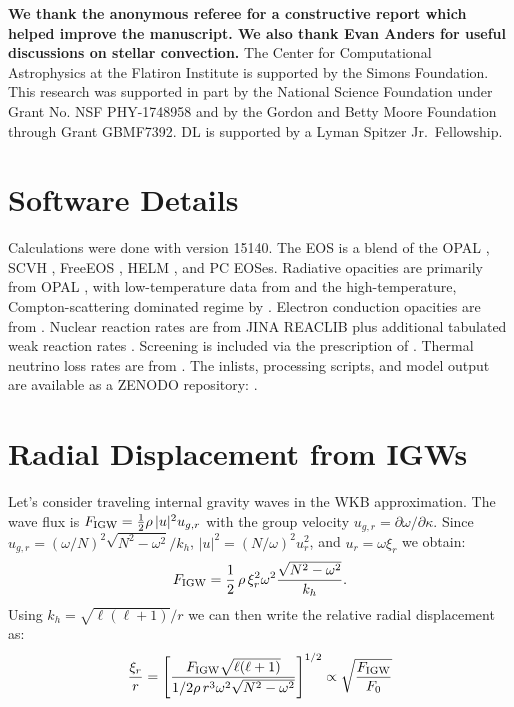 \documentclass[twocolumn]{aastex63}
\begin{document}
\acknowledgments
{\bf We thank the anonymous referee for a constructive report which helped improve the manuscript. We also thank Evan Anders for useful discussions on stellar convection.}
The Center for Computational Astrophysics at the Flatiron Institute is supported by the Simons Foundation.
This research was supported in part by the National Science Foundation under Grant No. NSF PHY-1748958 and by the Gordon and Betty Moore Foundation through Grant GBMF7392. DL is supported by a Lyman Spitzer Jr.~Fellowship.

\appendix
\section{Software Details}
\label{sec:software}

Calculations were done with  version 15140.
The  EOS is a blend of the OPAL \citep{Rogers2002}, SCVH
\citep{Saumon1995}, FreeEOS \citep{Irwin2004}, HELM \citep{Timmes2000},
and PC \citep{Potekhin2010} EOSes.
Radiative opacities are primarily from OPAL \citep{Iglesias1993,
Iglesias1996}, with low-temperature data from \citet{Ferguson2005}
and the high-temperature, Compton-scattering dominated regime by
\citet{Buchler1976}.  Electron conduction opacities are from
\citet{Cassisi2007}.
Nuclear reaction rates are from JINA REACLIB \citep{Cyburt2010} plus
additional tabulated weak reaction rates \citet{Fuller1985, Oda1994,
Langanke2000}.  Screening is included via the prescription of \citet{Chugunov2007}.
Thermal neutrino loss rates are from \citet{Itoh1996}.
The inlists, processing scripts, and model output are available as a ZENODO repository: .


\section{Radial Displacement from IGWs}
\label{appen:xir}
Let's consider traveling internal gravity waves in the WKB approximation. 
The wave flux  is  $F_{\rm IGW} = \frac{1}{2} \rho \, |u|^2 u_{g,r}$
 with the group velocity $u_{g,r} = \partial \omega/\partial \kappa $.
Since  $u_{g,r} = (\omega/N)^2 \sqrt{N^2 - \omega^2} / k_h$,  $|u|^2 = (N/\omega)^2 u_r^2$, and 
$u_r = \omega \xi_r$ we obtain: 
\begin{equation}
F_{\rm IGW} = \frac{1}{2} \,\rho\, \xi_r^2 \omega^2 \frac{\sqrt{N^2-\omega^2}}{k_h}.
\end{equation}
Using  $k_h = \sqrt{\ell(\ell+1)}/r$ we can then write the relative radial displacement as:
\begin{equation}
\frac{\xi_r}{r} = \left[ \frac{F_{\rm IGW} \sqrt{\ell(\ell+1)}}{1/2 \rho \,r^3 \omega^2 \sqrt{N^2-\omega^2}} \right]^{1/2} \propto \sqrt{\frac{F_{\rm IGW}}{F_0}}
\end{equation}
\end{document}
